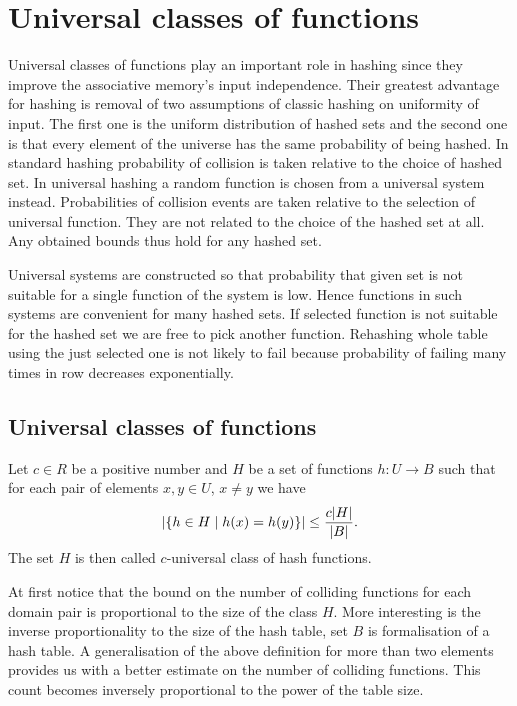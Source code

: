 \chapter{Universal classes of functions}

Universal classes of functions play an important role in hashing since they improve the associative memory's input independence. Their greatest advantage for hashing is removal of two assumptions of classic hashing on uniformity of input. The first one is the uniform distribution of hashed sets and the second one is that every element of the universe has the same probability of being hashed. In standard hashing probability of collision is taken relative to the choice of hashed set. In universal hashing a random function is chosen from a universal system instead. Probabilities of collision events are taken relative to the selection of universal function. They are not related to the choice of the hashed set at all. Any obtained bounds thus hold for any hashed set. 

Universal systems are constructed so that probability that given set is not suitable for a single function of the system is low. Hence functions in such systems are convenient for many hashed sets. If selected function is not suitable for the hashed set we are free to pick another function. Rehashing whole table using the just selected one is not likely to fail because probability of failing many times in row decreases exponentially.

\section{Universal classes of functions}

\begin{definition}
\label{c_universal_system}
Let $c \in R$ be a positive number and $H$ be a set of functions $h: U \rightarrow B$ such that for each pair of elements $x, y \in U$, $x \neq y$ we have \[ \left| \lbrace h \in H \mid h(x) = h(y) \rbrace \right| \leq \frac {c |H|}{|B|} \text{.} \] The set $H$ is then called $c$-universal class of hash functions.
\end{definition}

At first notice that the bound on the number of colliding functions for each domain pair is proportional to the size of the class $H$. More interesting is the inverse proportionality to the size of the hash table, set $B$ is formalisation of a hash table. A generalisation of the above definition for more than two elements provides us with a better estimate on the number of colliding functions. This count becomes inversely proportional to the power of the table size.

